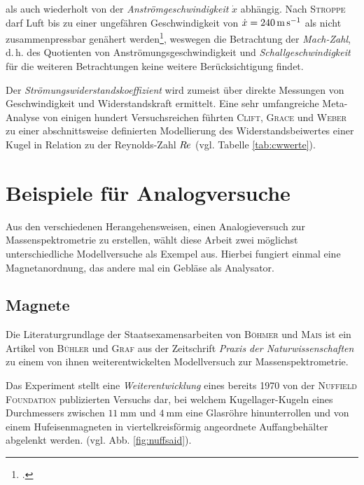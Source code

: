 als auch wiederholt von der \textit{Anströmgeschwindigkeit} $\dot{x}$ abhängig. Nach \textsc{Stroppe} darf Luft bis zu einer ungefähren Geschwindigkeit von $\dot{x}=\SI[fraction-function=\sfrac]{240}{\metre\per\second}$ als nicht zusammenpressbar genähert werden\footcite[vgl.][S.\,131]{Stroppe2008}, weswegen die Betrachtung der \textit{Mach-Zahl}, d.\,h. des Quotienten von Anströmungsgeschwindigkeit und \textit{Schallgeschwindigkeit} für die weiteren Betrachtungen keine weitere Berücksichtigung findet.\par
Der \textit{Strömungswiderstandskoeffizient} wird zumeist über direkte Messungen von Geschwindigkeit und Widerstandskraft ermittelt. Eine sehr umfangreiche Meta-Analyse von einigen hundert Versuchsreichen führten \textsc{Clift}, \textsc{Grace} und \textsc{Weber} zu einer abschnittsweise definierten Modellierung des Widerstandsbeiwertes einer Kugel in Relation zu der Reynolds-Zahl $R\kern-.04em e$ (vgl. Tabelle \ref{tab:cwwerte}).\vspace*{-2cm}\vspace*{2cm}
\vspace*{-0.1cm}\vspace*{-4cm}
\newpage
\section{Beispiele für Analogversuche}

Aus den verschiedenen Herangehensweisen, einen Analogieversuch zur Massenspektrometrie zu erstellen, wählt diese Arbeit zwei möglichst unterschiedliche Modellversuche als Exempel aus. Hierbei fungiert einmal eine Magnetanordnung, das andere mal ein Gebläse als Analysator.

\subsection{Magnete}

Die Literaturgrundlage der Staatsexamensarbeiten von \textsc{Böhmer} und \textsc{Mais} ist ein Artikel von \textsc{Bühler} und \textsc{Graf} aus der Zeitschrift \textit{Praxis der Naturwissenschaften} zu einem von ihnen weiterentwickelten Modellversuch zur Massenspektrometrie. 

Das Experiment stellt eine \textit{Weiterentwicklung} eines bereits 1970 von der \textsc{Nuffield Foundation} publizierten Versuchs dar, bei welchem Kugellager-Kugeln eines Durchmessers zwischen $\SI{11}{\milli\metre}$ und $\SI{4}{\milli\metre}$ eine Glasröhre hinunterrollen und von einem Hufeisenmagneten in viertelkreisförmig angeordnete Auffangbehälter abgelenkt werden. (vgl. Abb. \ref{fig:nuffsaid}).

